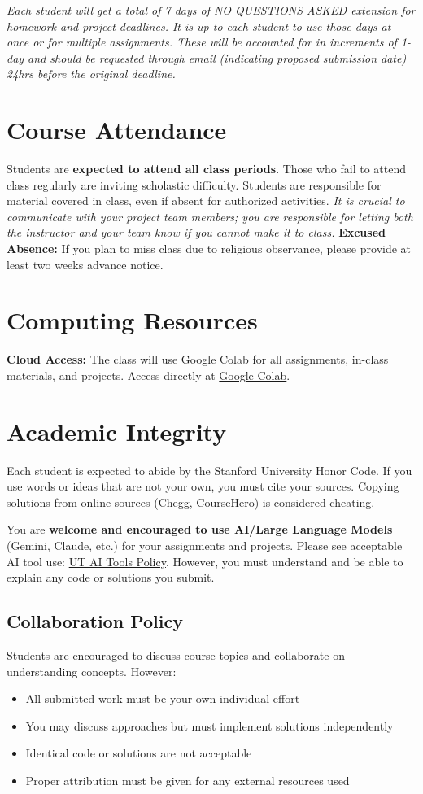 \documentclass[11pt,fourier]{article}
\begin{document}
	\textit{Each student will get a total of 7 days of NO QUESTIONS ASKED extension for homework and project deadlines. It is up to each student to use those days at once or for multiple assignments. These will be accounted for in increments of 1-day and should be requested through email (indicating proposed submission date) 24hrs before the original deadline.}
	
	\section*{Course Attendance}
	Students are \textbf{expected to attend all class periods}. Those who fail to attend class regularly are inviting scholastic difficulty. Students are responsible for material covered in class, even if absent for authorized activities. \textit{It is crucial to communicate with your project team members; you are responsible for letting both the instructor and your team know if you cannot make it to class.}
	\textbf{Excused Absence:} If you plan to miss class due to religious observance, please provide at least two weeks advance notice. 

	\section*{Computing Resources}
	\textbf{Cloud Access:} The class will use Google Colab for all assignments, in-class materials, and projects. Access directly at \href{https://colab.research.google.com/notebooks/intro.ipynb}{Google Colab}. 
	
	\section*{Academic Integrity}
	Each student is expected to abide by the Stanford University Honor Code. If you use words or ideas that are not your own, you must cite your sources. Copying solutions from online sources (Chegg, CourseHero) is considered cheating.
	
	You are \textbf{welcome and encouraged to use AI/Large Language Models} (Gemini, Claude, etc.) for your assignments and projects. Please see acceptable AI tool use: \href{https://security.utexas.edu/ai-tools}{UT AI Tools Policy}. However, you must understand and be able to explain any code or solutions you submit.
	
	\subsection*{Collaboration Policy}
	Students are encouraged to discuss course topics and collaborate on understanding concepts. However:
	\begin{itemize}
		\item All submitted work must be your own individual effort
		\item You may discuss approaches but must implement solutions independently  
		\item Identical code or solutions are not acceptable
		\item Proper attribution must be given for any external resources used
	\end{itemize}
	
\end{document}

